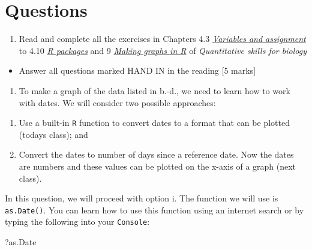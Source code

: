 \documentclass[]{book}
\newenvironment{Shaded}{\begin{snugshade}}{\end{snugshade}}
\newcommand{\NormalTok}[1]{{#1}}
\providecommand{\tightlist}{%
  \setlength{\itemsep}{0pt}\setlength{\parskip}{0pt}}
\begin{document}
\section{Questions}\label{questions-3}

\begin{enumerate}
\def\labelenumi{\arabic{enumi}.}
\tightlist
\item
  Read and complete all the exercises in Chapters 4.3
  \href{https://ahurford.github.io/quant-guide-all-courses/rintro.html\#variables-and-assignment}{\emph{Variables
  and assignment}} to 4.10
  \href{https://ahurford.github.io/quant-guide-all-courses/rintro.html\#r-packages}{\emph{R
  packages}} and 9
  \href{https://ahurford.github.io/quant-guide-all-courses/graph.html}{\emph{Making
  graphs in R}} of \emph{Quantitative skills for biology}
\end{enumerate}

\begin{itemize}
\tightlist
\item
  Answer all questions marked HAND IN in the reading {[}5 marks{]}
\end{itemize}

\begin{enumerate}
\def\labelenumi{\arabic{enumi}.}
\setcounter{enumi}{1}
\tightlist
\item
  To make a graph of the data listed in b.-d., we need to learn how to
  work with dates. We will consider two possible approaches:
\end{enumerate}

\begin{enumerate}
\def\labelenumi{\roman{enumi}.}
\item
  Use a built-in \texttt{R} function to convert dates to a format that
  can be plotted (todays class); and
\item
  Convert the dates to number of days since a reference date. Now the
  dates are numbers and these values can be plotted on the x-axis of a
  graph (next class).
\end{enumerate}

In this question, we will proceed with option i. The function we will
use is \texttt{as.Date()}. You can learn how to use this function using
an internet search or by typing the following into your
\texttt{Console}:

\begin{Shaded}
\begin{Highlighting}[]
\NormalTok{?as.Date}
\end{Highlighting}
\end{Shaded}
\end{document}
